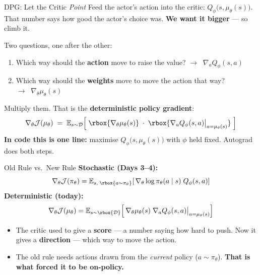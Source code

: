 \begin{frame}{DPG: Let the Critic \emph{Point} }
\vspace{0.4em}
Feed the actor's action into the critic: $Q_\phi\big(s, \mu_\theta(s)\big)$. That number says how good the actor's choice was. \textbf{We want it bigger} --- so climb it.
\pause
\vspace{0.7em}

Two questions, one after the other:
\begin{enumerate}
    \setlength{\itemsep}{0.35em}
    \item Which way should the \textbf{action} move to raise the value? \hfill $\rightarrow\;\; \nabla_a Q_\phi(s,a)$
    \item Which way should the \textbf{weights} move to move the action that way? \hfill $\rightarrow\;\; \nabla_\theta \mu_\theta(s)$
\end{enumerate}
\pause
\vspace{0.6em}
Multiply them. That is the \textbf{deterministic policy gradient}:
\[
\nabla_\theta \mathcal{J}(\mu_\theta) \;=\; \mathbb{E}_{s \sim \mathcal{D}}\!\left[\;
\rbox{\nabla_\theta \mu_\theta(s)} \;\cdot\; \rbox{\nabla_a Q_\phi(s,a)\big|_{a=\mu_\theta(s)}}
\;\right]
\]
\vspace{0.2em}
\centering
\textbf{In code this is one line:} maximise $Q_\phi\big(s,\mu_\theta(s)\big)$ with $\phi$ held fixed. Autograd does both steps.
\end{frame}

\begin{frame}{Old Rule vs.\ New Rule}
\vspace{0.4em}
\textbf{Stochastic (Days 3--4):}
\[
\nabla_\theta \mathcal{J}(\pi_\theta) = \mathbb{E}_{s,\; \rbox{a \sim \pi_\theta}}\!\left[\, \nabla_\theta \log \pi_\theta(a \mid s)\; Q_\phi(s, a) \right]
\]
\textbf{Deterministic (today):}
\[
\nabla_\theta \mathcal{J}(\mu_\theta) = \mathbb{E}_{s \sim \rbox{\mathcal{D}}}\!\left[\, \nabla_\theta \mu_\theta(s)\; \nabla_a Q_\phi(s, a)\big|_{a=\mu_\theta(s)} \right]
\]
\vspace{0.4em}
\begin{itemize}
    \setlength{\itemsep}{0.5em}
    \item The critic used to give a \textbf{score} --- a number saying how hard to push. Now it gives a \textbf{direction} --- which way to move the action.
    \item The old rule needs actions drawn from the \emph{current} policy ($a \sim \pi_\theta$). \textbf{That is what forced it to be on-policy.}
\end{itemize}
\end{frame}
